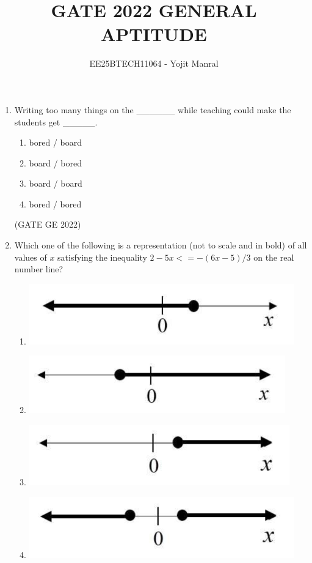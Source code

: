 \documentclass[journal,12pt,onecolumn]{IEEEtran}
\theoremstyle{remark}
\begin{document}
\title{GATE 2022 GENERAL APTITUDE}
\author{EE25BTECH11064 - Yojit Manral}

\maketitle

\begin{enumerate}

\textbf{Q.1 – Q.5 Carry ONE mark each.}

\item Writing too many things on the \_\_\_\_\_\_ while teaching could make the students get \_\_\_\_\_.
\begin{enumerate}
    \item bored / board
    \item board / bored
    \item board / board
    \item bored / bored
\end{enumerate}

\hfill (GATE GE 2022)

\item Which one of the following is a representation (not to scale and in bold) of all values of $x$ satisfying the inequality $2 - 5x <= - (6x - 5) / 3$ on the real number line?
\begin{enumerate}
    \item \includegraphics[width=\columnwidth]{figs/fig_2.1.png}
    \item \includegraphics[width=\columnwidth]{figs/fig_2.2.png}
    \item \includegraphics[width=\columnwidth]{figs/fig_2.3.png}
    \item \includegraphics[width=\columnwidth]{figs/fig_2.4.png}
\end{enumerate}


\end{enumerate}
\end{document}
